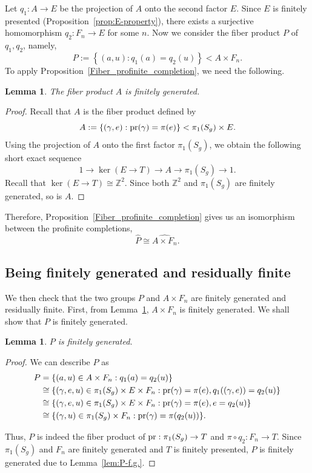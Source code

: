 \documentclass[11pt]{amsart}
\newtheorem{lem}[thm]{Lemma}
\theoremstyle{definition}
\newcommand{\ZZ}{\mathbb{Z}}
\begin{document}
 Let $q_1:A \to E$ be the projection of $A$ onto the second factor $E$.
 Since $E$ is finitely presented (Proposition~\ref{prop:E-property}), there exists a surjective homomorphism $q_2:F_n \to E$ for some $n$.
 Now we consider the fiber product $P$ of $q_1, q_2$, namely,
 $$P:=\left \{ (a,u) : q_1(a)=q_2(u) \right \}< A \times F_n.$$
 To apply Proposition~\ref{Fiber_profinite_completion}, we need the following.

 \begin{lem} \label{lem:A-f.g. 4}
 The fiber product $A$ is finitely generated.
 \end{lem}
 \begin{proof}
 Recall that $A$ is the fiber product defined by $$ A:= \left\{ (\gamma,e) : \textnormal{pr}(\gamma)=\pi(e) \right\}<\pi_1(S_g) \times E. $$
 Using the projection of $A$ onto the first factor $\pi_1(S_g)$, we obtain the following short exact sequence
 $$ 1 \to \ker(E \to T) \to A \to \pi_1(S_g) \to 1. $$
 Recall that $\ker(E \to T) \cong \ZZ^2$.
 Since both $\ZZ^2$ and $\pi_1(S_g)$ are finitely generated, so is $A$.
\end{proof}
 
Therefore, Proposition~\ref{Fiber_profinite_completion} gives us an isomorphism between the profinite completions, $$\widehat{P} \cong \widehat{A \times F_n}.$$

\subsection{Being finitely generated and residually finite}

 We then check that the two groups $P$ and $A \times F_n$ are finitely generated and residually finite.
First, from Lemma~\ref{lem:A-f.g. 4}, $A \times F_n$ is finitely generated.
We shall show that $P$ is finitely generated.

\begin{lem}
$P$ is finitely generated.
\end{lem}
\begin{proof}
We can describe $P$ as 
\begin{align*}
 P &= \left \{ (a,u) \in A \times F_n: q_1(a)=q_2(u) \right \} \\
 &\cong \left \{ (\gamma,e,u) \in \pi_1(S_g) \times E \times F_n : \textnormal{pr}(\gamma)=\pi(e), q_1((\gamma,e))=q_2(u) \right \} \\
 &\cong \left \{ (\gamma,e,u) \in \pi_1(S_g) \times E \times F_n : \textnormal{pr}(\gamma)=\pi(e), e=q_2(u) \right \} \\
 &\cong \{ (\gamma,u) \in \pi_1(S_g) \times F_n : \textnormal{pr}(\gamma)=\pi(q_2(u)) \}. 
\end{align*}

Thus,  $P$ is indeed the fiber product of $\textnormal{pr}:\pi_1(S_g) \to T$ and $\pi \circ q_2  : F_n \to T.$
Since $\pi_1(S_g)$ and $F_n$ are finitely generated and $T$ is finitely presented, $P$ is finitely generated due to Lemma~\ref{lem:P-f.g.}.
\end{proof}
\end{document}
